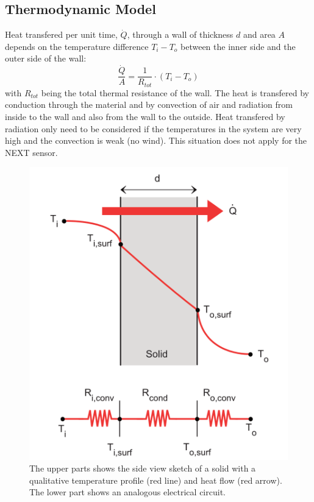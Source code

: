 \subsection{Thermodynamic Model}\label{chapter:basics}
Heat transfered per unit time, \(\dot Q\), through a wall of thickness \(d\) and area \(A\) depends on the temperature difference \(T_i - T_o\) between the inner side and the outer side of the wall:
\begin{equation}
\frac{\dot Q}{A} =  \frac{1}{R_{tot}}\cdot (T_i - T_o)
\end{equation}
with \(R_{tot}\) being the total thermal resistance of the wall. The heat is transfered by conduction through the material and by convection of air and radiation from inside to the wall and also from the wall to the outside. Heat transfered by radiation only need to be considered if the temperatures in the system are very high and the convection is weak (no wind). This situation does not apply for the NEXT sensor. 

\begin{figure} [H]
	\centering
	\includegraphics[scale=0.75]{Pictures/SimplePlate.png}
	\caption[SimplePlate]{The upper parts shows the side view sketch of a solid with a qualitative temperature profile (red line) and heat flow (red arrow). The lower part shows an analogous electrical circuit.}
	\label{fig:simpleplate}
\end{figure}

